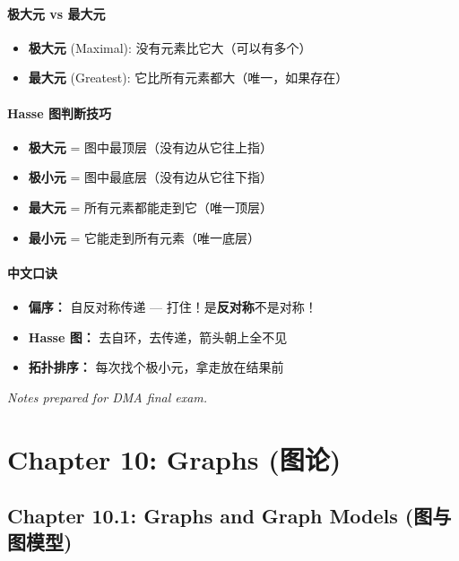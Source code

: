 \documentclass[10pt,a4paper,openany]{ctexbook}
\theoremstyle{definition}
\theoremstyle{remark}
\begin{document}
\subsubsection{极大元 vs 最大元}

\begin{itemize}
\item \textbf{极大元} (Maximal): 没有元素比它大（可以有多个）
\item \textbf{最大元} (Greatest): 它比所有元素都大（唯一，如果存在）

\end{itemize}

\subsubsection{Hasse 图判断技巧}

\begin{itemize}
\item \textbf{极大元} = 图中最顶层（没有边从它往上指）
\item \textbf{极小元} = 图中最底层（没有边从它往下指）
\item \textbf{最大元} = 所有元素都能走到它（唯一顶层）
\item \textbf{最小元} = 它能走到所有元素（唯一底层）

\end{itemize}

\subsubsection{中文口诀}

\begin{itemize}
\item \textbf{偏序：} 自反对称传递 — 打住！是\textbf{反对称}不是对称！
\item \textbf{Hasse 图：} 去自环，去传递，箭头朝上全不见
\item \textbf{拓扑排序：} 每次找个极小元，拿走放在结果前

\end{itemize}

\vspace{-2pt}

\textit{Notes prepared for DMA final exam.}

\chapter{Chapter 10: Graphs (图论)}

\section{Chapter 10.1: Graphs and Graph Models (图与图模型)}
\end{document}
